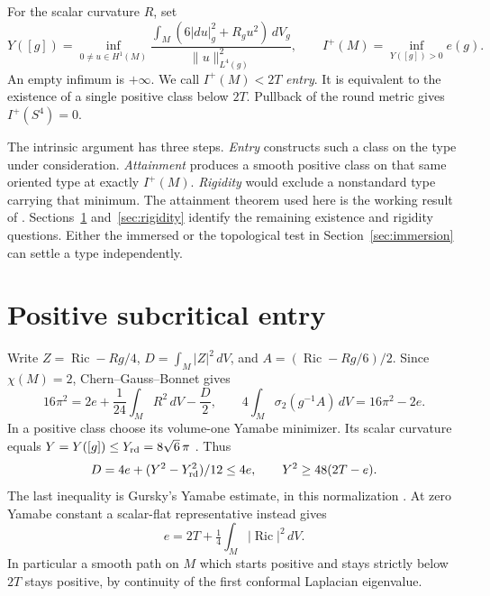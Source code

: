 \documentclass[11pt,letterpaper]{article}
\numberwithin{equation}{section}
\DeclareMathOperator{\Ric}{Ric}
\begin{document}
For the scalar curvature \(R\), set
\begin{equation}\label{eq:yamabe}
 Y([g])=\inf_{0\ne u\in H^1(M)}
 \frac{\int_M(6|du|_g^2+R_gu^2)\,dV_g}{\|u\|_{L^4(g)}^2},
 \qquad I^+(M)=\inf_{Y([g])>0} e(g).
\end{equation}
An empty infimum is \(+\infty\). We call \(I^+(M)<2T\) \emph{entry}.
It is equivalent to the existence of a single positive class below \(2T\).
Pullback of the round metric gives \(I^+(S^4)=0\).

The intrinsic argument has three steps. \emph{Entry} constructs such
a class on the type under consideration. \emph{Attainment} produces a
smooth positive class on that same oriented type at exactly \(I^+(M)\).
\emph{Rigidity} would exclude a nonstandard type carrying that minimum.
The attainment theorem used here is the working result of
\cite{Baker2026BourAttainment}. Sections~\ref{sec:thresholds}
and~\ref{sec:rigidity} identify the remaining existence and rigidity
questions. Either the immersed or the topological test in
Section~\ref{sec:immersion} can settle a type independently.

\section{Positive subcritical entry}\label{sec:thresholds}

Write \(Z=\Ric-Rg/4\), \(D=\int_M|Z|^2\,dV\), and
\(A=(\Ric-Rg/6)/2\). Since \(\chi(M)=2\), Chern--Gauss--Bonnet gives
\begin{equation}\label{eq:schouten}
 16\pi^2=2e+\frac1{24}\int_M R^2\,dV-\frac{D}{2},
 \qquad 4\int_M\sigma_2(g^{-1}A)\,dV=16\pi^2-2e .
\end{equation}
In a positive class choose its volume-one Yamabe minimizer. Its scalar
curvature equals \(Y=Y([g])\le Y_{\rm rd}=8\sqrt6\,\pi\)
\cite{Schoen1984Yamabe,LeeParker1987Yamabe}. Thus
\begin{equation}\label{eq:budgets}
 D=4e+(Y^2-Y_{\rm rd}^2)/12\le4e,\qquad Y^2\ge48(2T-e).
\end{equation}
The last inequality is Gursky's Yamabe estimate, in this normalization
\cite[Lemma 4.5]{Bour2010FourthOrderCurvatureFlows}. At zero Yamabe
constant a scalar-flat representative instead gives
\begin{equation}\label{eq:zero-wall}
 e=2T+\tfrac14\int_M|\Ric|^2\,dV .
\end{equation}
In particular a smooth path on \(M\) which starts positive and stays
strictly below \(2T\) stays positive, by continuity of the first
conformal Laplacian eigenvalue.
\end{document}
